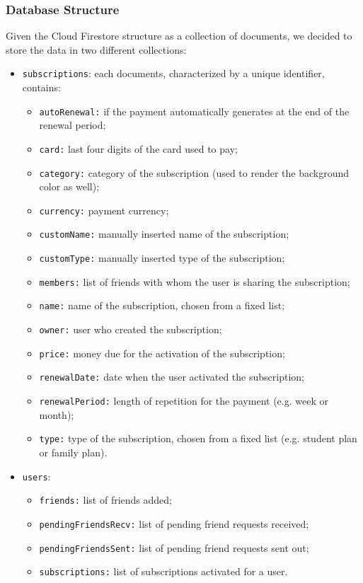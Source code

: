 \documentclass[12pt]{article}
\begin{document}
\subsubsection{Database Structure}
Given the Cloud Firestore structure as a collection of documents, we decided to store the data in two different collections: \begin{itemize}
    \item \texttt{subscriptions}: each documents, characterized by a unique identifier, contains: \begin{itemize}
              \item \texttt{autoRenewal:} if the payment automatically generates at the end of the renewal period;
              \item \texttt{card:} last four digits of the card used to pay;
              \item \texttt{category:} category of the subscription (used to render the background color as well);
              \item \texttt{currency:} payment currency;
              \item \texttt{customName:} manually inserted name of the subscription;
              \item \texttt{customType:} manually inserted type of the subscription;
              \item \texttt{members:} list of friends with whom the user is sharing the subscription;
              \item \texttt{name:} name of the subscription, chosen from a fixed list;
              \item \texttt{owner:} user who created the subscription;
              \item \texttt{price:} money due for the activation of the subscription;
              \item \texttt{renewalDate:} date when the user activated the subscription;
              \item \texttt{renewalPeriod:} length of repetition for the payment (e.g. week or month);
              \item \texttt{type:} type of the subscription, chosen from a fixed list (e.g. student plan or family plan).
          \end{itemize}
    \item \texttt{users}:  \begin{itemize}
              \item \texttt{friends:} list of friends added;
              \item \texttt{pendingFriendsRecv:} list of pending friend requests received;
              \item \texttt{pendingFriendsSent:} list of pending friend requests sent out;
              \item \texttt{subscriptions:} list of subscriptions activated for a user.
          \end{itemize}
\end{itemize}
\end{document}
